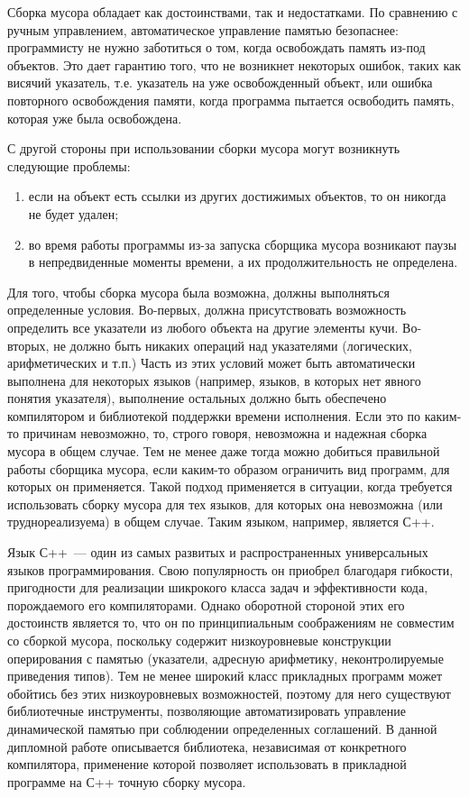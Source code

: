 Сборка мусора обладает как достоинствами, так и недостатками. По сравнению с ручным управлением, автоматическое 
управление памятью безопаснее: программисту не нужно заботиться о том, когда освобождать память из-под объектов. 
Это дает гарантию того, что не возникнет некоторых ошибок, таких как висячий указатель, т.е. указатель на уже 
освобожденный объект, или ошибка повторного освобождения памяти, когда программа пытается освободить память, 
которая уже была освобождена.

С другой стороны при использовании сборки мусора могут возникнуть следующие проблемы:

\begin{enumerate}
\item если на объект есть ссылки из других достижимых объектов, то он никогда не будет удален;
\item во время работы программы из-за запуска сборщика мусора возникают паузы в непредвиденные моменты времени, а их 
продолжительность не определена.
\end{enumerate}

Для того, чтобы сборка мусора была возможна, должны выполняться определенные условия. Во-первых, должна присутствовать 
возможность определить все указатели из любого объекта на другие элементы кучи. Во-вторых, не должно быть никаких 
операций над указателями (логических, арифметических и т.п.) Часть из этих условий может быть автоматически выполнена
для некоторых языков (например, языков, в которых нет явного понятия указателя), выполнение остальных должно быть
обеспечено компилятором и библиотекой поддержки времени исполнения. Если это по каким-то причинам невозможно, то, строго
говоря, невозможна и надежная сборка мусора в общем случае. Тем не менее даже тогда можно добиться правильной
работы сборщика мусора, если каким-то образом ограничить вид программ, для которых он применяется. Такой подход применяется 
в ситуации, когда требуется использовать сборку мусора для тех языков, для которых она невозможна (или труднореализуема) 
в общем случае. Таким языком, например, является С++.

Язык С++~--- один из самых развитых и распространенных универсальных языков программирования. Свою популярность он приобрел 
благодаря гибкости, пригодности для реализации шикрокого класса задач и эффективности кода, порождаемого его 
компиляторами. Однако оборотной стороной этих его достоинств является то, что он по принципиальным соображениям не 
совместим со сборкой мусора, поскольку содержит низкоуровневые конструкции оперирования с памятью (указатели, адресную 
арифметику, неконтролируемые приведения типов). Тем не менее широкий класс прикладных программ может обойтись без этих
низкоуровневых возможностей, поэтому для него существуют библиотечные инструменты, позволяющие автоматизировать
управление динамической памятью при соблюдении определенных соглашений. В данной дипломной работе описывается
библиотека, независимая от конкретного компилятора, применение которой позволяет использовать в прикладной
программе на С++ точную сборку мусора.
